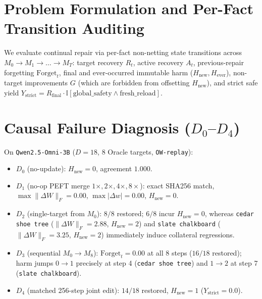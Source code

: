 \documentclass[11pt]{article}
\begin{document}
\section{Problem Formulation and Per-Fact Transition Auditing}
We evaluate continual repair via per-fact non-netting state transitions across $M_0 \to M_1 \to \dots \to M_T$: target recovery $R_t$, active recovery $A_t$, previous-repair forgetting $\text{Forget}_t$, final and ever-occurred immutable harm ($H_{\text{new}}, H_{\text{ever}}$), non-target improvements $G$ (which are forbidden from offsetting $H_{\text{new}}$), and strict safe yield $Y_{\text{strict}} = R_{\text{final}} \cdot \mathbb{I}[\text{global\_safety} \land \text{fresh\_reload}]$.

\section{Causal Failure Diagnosis ($D_0$--$D_4$)}
On \texttt{Qwen2.5-Omni-3B} ($D=18$, $8$ Oracle targets, \texttt{OW-replay}):
\begin{itemize}
  \item $D_0$ (no-update): $H_{\text{new}}=0$, agreement $1.000$.
  \item $D_1$ (no-op PEFT merge $1\times, 2\times, 4\times, 8\times$): exact SHA256 match, $\max \|\Delta W\|_F = 0.00$, $\max |\Delta w| = 0.00$, $H_{\text{new}}=0$.
  \item $D_2$ (single-target from $M_0$): $8/8$ restored; $6/8$ incur $H_{\text{new}}=0$, whereas \texttt{cedar shoe tree} ($\|\Delta W\|_F=2.88$, $H_{\text{new}}=2$) and \texttt{slate chalkboard} ($\|\Delta W\|_F=3.25$, $H_{\text{new}}=2$) immediately induce collateral regressions.
  \item $D_3$ (sequential $M_0 \to M_8$): $\text{Forget}_t = 0.00$ at all 8 steps ($16/18$ restored); harm jumps $0 \to 1$ precisely at step 4 (\texttt{cedar shoe tree}) and $1 \to 2$ at step 7 (\texttt{slate chalkboard}).
  \item $D_4$ (matched 256-step joint edit): $14/18$ restored, $H_{\text{new}}=1$ ($Y_{\text{strict}}=0.0$).
\end{itemize}
\end{document}

